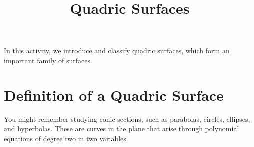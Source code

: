 \documentclass{ximera}
\title{Quadric Surfaces}
\begin{document}
\begin{abstract}
\end{abstract}
\maketitle


In this activity, we introduce and classify quadric surfaces, which form an important family of surfaces.

\section{Definition of a Quadric Surface}

You might remember studying conic sections, such as parabolas, circles, ellipses, and hyperbolas. These are curves in the plane that arise through polynomial equations of degree two in two variables.

\begin{image}
\end{image}
\end{document}
